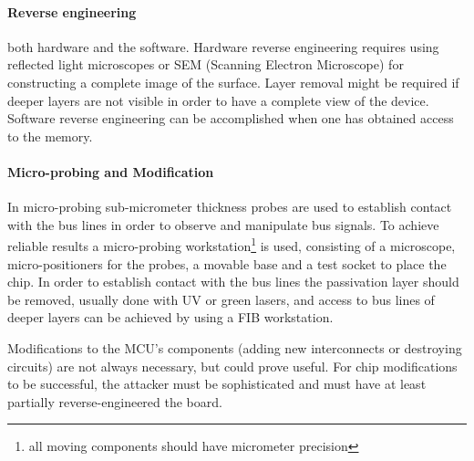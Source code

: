 	\paragraph{Reverse engineering} both hardware and the software. Hardware reverse engineering requires using reflected light microscopes or SEM (Scanning Electron Microscope) for constructing a complete image of the surface. Layer removal might be required if deeper layers are not visible in order to have a complete view of the device. Software reverse engineering can be accomplished when one has obtained access to the memory.
	
	\paragraph{Micro-probing and Modification} In micro-probing sub-micrometer thickness probes are used to establish contact with the bus lines in order to observe and manipulate bus signals. To achieve reliable results a micro-probing workstation\footnote{all moving components should have micrometer precision} is used, consisting of a microscope, micro-positioners for the probes, a movable base and a test socket to place the chip. In order to establish contact with the bus lines the passivation layer should be removed, usually done with UV or green lasers, and access to bus lines of deeper layers can be achieved by using a FIB workstation.
	
	Modifications to the MCU's components (adding new interconnects or destroying circuits) are not always necessary, but could prove useful\citep{anderson:tamper_resistance}. For chip modifications to be successful, the attacker must be sophisticated and must have at least partially reverse-engineered the board.
